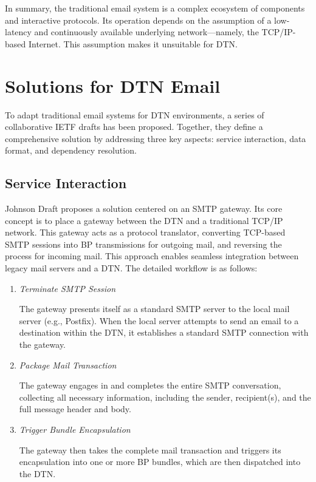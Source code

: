 In summary, the traditional email system is a complex ecosystem of components and interactive protocols. Its operation depends on the assumption of a low-latency and continuously available underlying network—namely, the TCP/IP-based Internet. This assumption makes it unsuitable for DTN.

\section{Solutions for DTN Email}
To adapt traditional email systems for DTN environments, a series of collaborative IETF drafts has been proposed. Together, they define a comprehensive solution by addressing three key aspects: service interaction, data format, and dependency resolution.

\subsection{Service Interaction}

Johnson Draft \cite{draft-johnson-dtn-interplanetary-smtp} proposes a solution centered on an SMTP gateway. Its core concept is to place a gateway between the DTN and a traditional TCP/IP network. This gateway acts as a protocol translator, converting TCP-based SMTP sessions into BP transmissions for outgoing mail, and reversing the process for incoming mail. This approach enables seamless integration between legacy mail servers and a DTN. The detailed workflow is as follows:

\begin{enumerate}
    \item \textit{Terminate SMTP Session}
    
    The gateway presents itself as a standard SMTP server to the local mail server (e.g., Postfix). When the local server attempts to send an email to a destination within the DTN, it establishes a standard SMTP connection with the gateway.
    \item \textit{Package Mail Transaction}
    
    The gateway engages in and completes the entire SMTP conversation, collecting all necessary information, including the sender, recipient(s), and the full message header and body.
    \item \textit{Trigger Bundle Encapsulation}
    
    The gateway then takes the complete mail transaction and triggers its encapsulation into one or more BP bundles, which are then dispatched into the DTN.
\end{enumerate}

